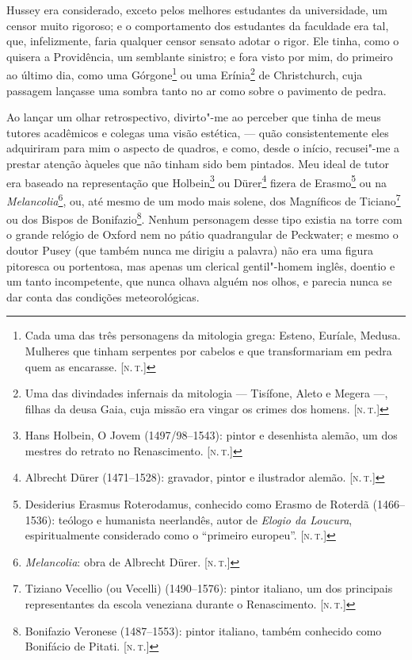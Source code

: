 Hussey era considerado, exceto pelos melhores estudantes da
universidade, um censor muito rigoroso; e o comportamento dos estudantes
da faculdade era tal, que, infelizmente, faria qualquer censor sensato
adotar o rigor. Ele tinha, como o quisera a Providência, um semblante
sinistro; e fora visto por mim, do primeiro ao último dia, como uma
Górgone\footnote{Cada uma das três personagens da mitologia grega:
  Esteno, Euríale, Medusa. Mulheres que tinham serpentes por cabelos e
  que transformariam em pedra quem as encarasse. {[}\textsc{n.\,t.}{]}} ou uma
Erínia\footnote{Uma das divindades infernais da mitologia --- Tisífone,
  Aleto e Megera ---, filhas da deusa Gaia, cuja missão era vingar os
  crimes dos homens. {[}\textsc{n.\,t.}{]}} de Christchurch, cuja passagem
lançasse uma sombra tanto no ar como sobre o pavimento de pedra.

Ao lançar um olhar retrospectivo, divirto"-me ao perceber que tinha de
meus tutores acadêmicos e colegas uma visão estética, --- quão
consistentemente eles adquiriram para mim o aspecto de quadros, e como,
desde o início, recusei"-me a prestar atenção àqueles que não tinham sido
bem pintados. Meu ideal de tutor era baseado na representação que
Holbein\footnote{Hans Holbein, O Jovem (1497/98--1543): pintor e
  desenhista alemão, um dos mestres do retrato no Renascimento. {[}\textsc{n.\,t.}{]}} ou Dürer\footnote{Albrecht Dürer (1471--1528): gravador, pintor
  e ilustrador alemão. {[}\textsc{n.\,t.}{]}} fizera de Erasmo\footnote{Desiderius
  Erasmus Roterodamus, conhecido como Erasmo de Roterdã
  (1466--1536):
  teólogo e humanista neerlandês, autor
  de \emph{Elogio da Loucura}, espiritualmente considerado como o
  ``primeiro europeu''. {[}\textsc{n.\,t.}{]}} ou na
\emph{Melancolia}\footnote{\emph{Melancolia}: obra de Albrecht Dürer.
  {[}\textsc{n.\,t.}{]}}, ou, até mesmo de um modo mais solene, dos Magníficos
de Ticiano\footnote{Tiziano Vecellio (ou Vecelli) (1490--1576): pintor
  italiano, um dos principais representantes da escola veneziana durante
  o Renascimento. {[}\textsc{n.\,t.}{]}} ou dos Bispos de Bonifazio\footnote{Bonifazio
  Veronese (1487--1553): pintor italiano, também conhecido como Bonifácio
  de Pitati. {[}\textsc{n.\,t.}{]}}. Nenhum personagem desse tipo existia na
torre com o grande relógio de Oxford nem no pátio quadrangular de
Peckwater; e mesmo o doutor Pusey (que também nunca me dirigiu a
palavra) não era uma figura pitoresca ou portentosa, mas apenas um
clerical gentil"-homem inglês, doentio e um tanto incompetente, que nunca
olhava alguém nos olhos, e parecia nunca se dar conta das condições
meteorológicas.

